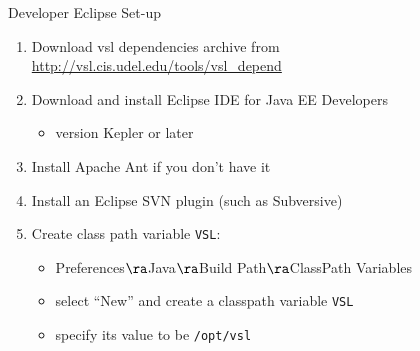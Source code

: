 \documentclass[t]{beamer}
\begin{document}
\begin{frame}{Developer Eclipse Set-up}
  \begin{enumerate}
  \item Download vsl dependencies archive from
    \url{http://vsl.cis.udel.edu/tools/vsl_depend}
  \item Download and install Eclipse IDE for Java EE Developers
    \begin{itemize}
    \item version Kepler or later
    \end{itemize}
  \item Install Apache Ant if you don't have it
  \item Install an Eclipse SVN plugin (such as Subversive)
  \item Create class path variable \texttt{VSL}:
    \begin{itemize}
    \item Preferences$\ra$Java$\ra$Build Path$\ra$ClassPath Variables
    \item select ``New'' and create a classpath variable \texttt{VSL}
    \item specify its value to be \texttt{/opt/vsl}
    \end{itemize}
  \end{enumerate}
\end{frame}
\end{document}
